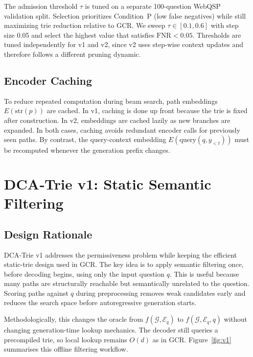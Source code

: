 The admission threshold $\tau$ is tuned on a separate 100-question WebQSP validation split. Selection prioritizes Condition~P (low false negatives) while still maximizing trie reduction relative to GCR. We sweep $\tau \in [0.1, 0.6]$ with step size 0.05 and select the highest value that satisfies $\text{FNR} < 0.05$. Thresholds are tuned independently for v1 and v2, since v2 uses step-wise context updates and therefore follows a different pruning dynamic.

\subsection{Encoder Caching}

To reduce repeated computation during beam search, path embeddings $E(\text{str}(p))$ are cached. In v1, caching is done up front because the trie is fixed after construction. In v2, embeddings are cached lazily as new branches are expanded. In both cases, caching avoids redundant encoder calls for previously seen paths. By contrast, the query-context embedding $E(\text{query}(q, y_{<t}))$ must be recomputed whenever the generation prefix changes.

\section{DCA‑Trie v1: Static Semantic Filtering}
\label{sec:ch3v1}

\subsection{Design Rationale}

DCA‑Trie v1 addresses the permissiveness problem while keeping the efficient static-trie design used in GCR. The key idea is to apply semantic filtering once, before decoding begins, using only the input question $q$. This is useful because many paths are structurally reachable but semantically unrelated to the question. Scoring paths against $q$ during preprocessing removes weak candidates early and reduces the search space before autoregressive generation starts.

Methodologically, this changes the oracle from $f(\mathcal{G}, \mathcal{E}_q)$ to $f(\mathcal{G}, \mathcal{E}_q, q)$ without changing generation-time lookup mechanics. The decoder still queries a precompiled trie, so local lookup remains $O(d)$ as in GCR. Figure~\ref{fig:v1} summarises this offline filtering workflow.

